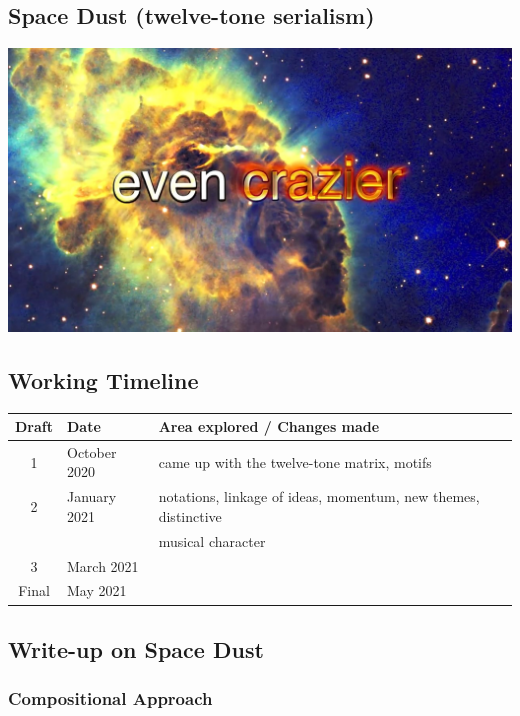 \documentclass{article}
\begin{document}
\begin{center}
\vspace*{\fill}
\LARGE
    \section{Space Dust (twelve-tone serialism)}
    \includegraphics[width=\textwidth]{dust.jpg}
\vspace*{\fill}
%
\end{center}

\newpage

\subsection{Working Timeline}
\begin{center}
	\def\arraystretch{1.5}
\begin{tabular}{|c|l|l|}
	\hline
	Draft&Date&Area explored / Changes made\\
	\hline
	1&October 2020&
    came up with the twelve-tone matrix, motifs\\
	\hline
	2&January 2021&
    notations, linkage of ideas, momentum, new themes, distinctive\\
    &&musical character\\
	\hline
	3&March 2021&\\
	\hline
	Final&May 2021&\\
	\hline
\end{tabular}
\end{center}

\subsection{Write-up on {\bf Space Dust}}

\subsubsection{Compositional Approach}
\end{document}
